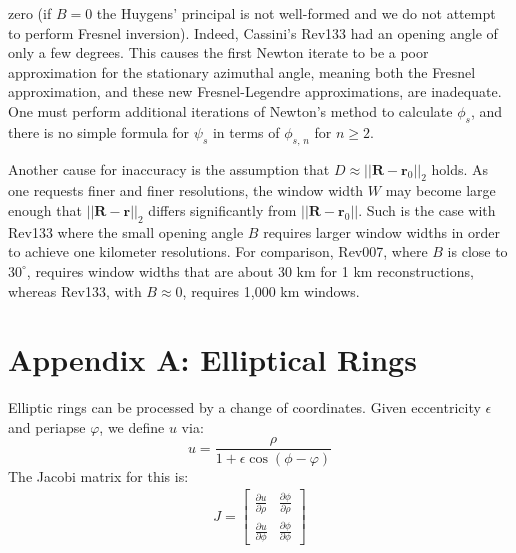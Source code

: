 \documentclass{article}
\begin{document}
        zero (if $B=0$ the Huygens' principal is not well-formed and we do not
        attempt to perform Fresnel inversion). Indeed, Cassini's Rev133 had an
        opening angle of only a few degrees. This causes the first Newton
        iterate to be a poor approximation for the stationary azimuthal angle,
        meaning both the Fresnel approximation, and these new Fresnel-Legendre
        approximations, are inadequate. One must perform additional iterations
        of Newton's method to calculate $\phi_{s}$, and there is no simple
        formula for $\psi_{s}$ in terms of $\phi_{s,\,n}$ for $n\geq{2}$.
        \par\hfill\par
        Another cause for inaccuracy is the assumption that
        $D\approx||\mathbf{R}-\mathbf{r}_{0}||_{2}$ holds. As one requests
        finer and finer resolutions, the window width $W$ may become large
        enough that $||\mathbf{R}-\mathbf{r}||_{2}$ differs significantly from
        $||\mathbf{R}-\mathbf{r}_{0}||$. Such is the case with Rev133 where the
        small opening angle $B$ requires larger window widths in order to
        achieve one kilometer resolutions. For comparison, Rev007, where $B$ is
        close to $30^{\circ}$, requires window widths that are about 30 km for
        1 km reconstructions, whereas Rev133, with $B\approx{0}$, requires
        1,000 km windows.
    \setcounter{secnumdepth}{0}
    \section{Appendix A: Elliptical Rings}
        Elliptic rings can be processed by a change of coordinates.
        Given eccentricity $\epsilon$ and periapse $\varphi$, we define $u$
        via:
        \begin{equation}
            u=\frac{\rho}{1+\epsilon\cos(\phi-\varphi)}
        \end{equation}
        The Jacobi matrix for this is:
        \begin{subequations}
            \begin{align}
                J=\begin{bmatrix}
                    \frac{\partial{u}}{\partial\rho}
                        &\frac{\partial\phi}{\partial\rho}\\[1em]
                    \frac{\partial{u}}{\partial\phi}
                        &\frac{\partial\phi}{\partial\phi}
                \end{bmatrix}
            \end{align}
        \end{subequations}
\end{document}

